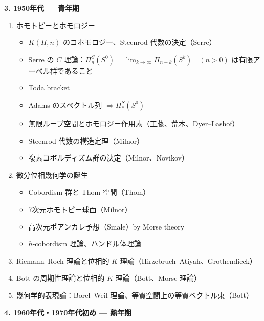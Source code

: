 \documentclass[uplatex,dvipdfmx]{jlreq}
\begin{document}
\medskip
\noindent\textbf{3. 1950年代 --- 青年期}

\begin{enumerate}
  \item ホモトピーとホモロジー
        \begin{itemize}
          \item $K(\Pi, n)$ のコホモロジー、Steenrod 代数の決定（Serre）
          \item Serre の $C$ 理論：$\Pi_n^S(S^0) = \lim_{k\to\infty} \Pi_{n+k}(S^k) \quad (n>0)$
                は有限アーベル群であること
          \item Toda bracket
          \item Adams のスペクトル列 $\Longrightarrow \Pi_*^S(S^0)$
          \item 無限ループ空間とホモロジー作用素（工藤、荒木、Dyer--Lashof）
          \item Steenrod 代数の構造定理（Milnor）
          \item 複素コボルディズム群の決定（Milnor、Novikov）
        \end{itemize}
  \item 微分位相幾何学の誕生
        \begin{itemize}
          \item Cobordism 群と Thom 空間（Thom）
          \item 7次元ホモトピー球面（Milnor）
          \item 高次元ポアンカレ予想（Smale）by Morse theory
          \item $h$-cobordism 理論、ハンドル体理論
        \end{itemize}
  \item Riemann--Roch 理論と位相的 $K$-理論（Hirzebruch--Atiyah、Grothendieck）
  \item Bott の周期性理論と位相的 $K$-理論（Bott、Morse 理論）
  \item 幾何学的表現論：Borel--Weil 理論、等質空間上の等質ベクトル束（Bott）
\end{enumerate}

\medskip
\noindent\textbf{4. 1960年代・1970年代初め --- 熟年期}
\end{document}
